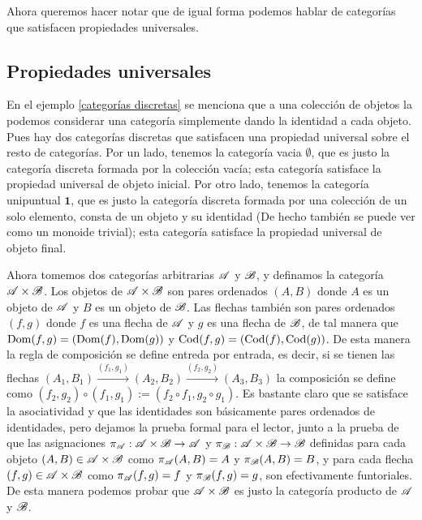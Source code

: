\documentclass{comunicaciones}
\begin{document}
Ahora queremos hacer notar que de igual forma podemos hablar de categorías que satisfacen propiedades universales.

\subsection{Propiedades universales}

En el ejemplo \ref{categorías discretas} se menciona que a una colección de objetos la podemos considerar una categoría simplemente dando la identidad a cada objeto.
Pues hay dos categorías discretas que satisfacen una propiedad universal sobre el resto de categorías. Por un lado, tenemos la categoría vacia $\mathbb{\emptyset}$, que es
justo la categoría discreta formada por la colección vacía; esta categoría satisface la propiedad universal de objeto inicial. Por otro lado, tenemos la categoría
unipuntual $\mathbf{1}$, que es justo la categoría discreta formada por una colección de un solo elemento, consta de un objeto y su identidad (De hecho también 
se puede ver como un monoide trivial); esta categoría satisface la propiedad universal de objeto final.

Ahora tomemos dos categorías arbitrarias $\mathscr A$ y $\mathscr B$, y definamos la categoría $\mathscr A\times\mathscr B$. Los objetos de $\mathscr A\times\mathscr B$ son pares ordenados $(A,B)$ donde $A$
es un objeto de $\mathscr A$ y $B$ es un objeto de $\mathscr B$. Las flechas también son pares ordenados $(f,g)$ donde $f$ es una flecha de $\mathscr A$ y $g$ es una flecha de $\mathscr B$,
de tal manera que $\mathrm{Dom}(f,g)=(\mathrm{Dom}(f),\mathrm{Dom}(g))$ y $\mathrm{Cod}(f,g)=(\mathrm{Cod}(f),\mathrm{Cod}(g))$. De esta manera la regla de composición se define entreda por entrada, es decir,
si se tienen las flechas $(A_1,B_1)\xrightarrow{(f_1,g_1)}(A_2,B_2)\xrightarrow{(f_2,g_2)}(A_3,B_3)$ la composición se define como $(f_2,g_2)\circ(f_1,g_1)
:=(f_2\circ f_1,g_2\circ g_1)$. Es bastante claro que se satisface la asociatividad y que las identidades son básicamente pares ordenados de identidades, pero
dejamos la prueba formal para el lector, junto a la prueba de que las asignaciones $\pi_\mathscr A:\mathscr A\times\mathscr B\to\mathscr A$ y $\pi_\mathscr B:\mathscr A\times\mathscr B\to\mathscr B$ definidas para cada objeto
$(A,B)\in\mathscr A\times\mathscr B$ como $\pi_\mathscr A(A,B)=A$ y $\pi_\mathscr B(A,B)=B$, y para cada flecha $(f,g)\in\mathscr A\times\mathscr B$ como $\pi_\mathscr A(f,g)=f$ y $\pi_\mathscr B(f,g)=g$, son efectivamente 
funtoriales. De esta manera podemos probar que $\mathscr A\times\mathscr B$ es justo la categoría producto de $\mathscr A$ y $\mathscr B$.
\end{document}
